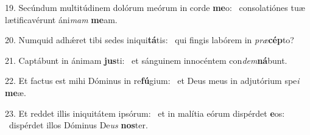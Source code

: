 19. Secúndum multitúdinem dolórum meórum in corde \textbf{me}o: \ast\  consolatiónes tuæ lætificavérunt áni\textit{mam} \textbf{me}am.\

20. Numquid adhǽret tibi sedes iniqui\textbf{tá}tis: \ast\  qui fingis labórem in \textit{præ}\textbf{cép}to?\

21. Captábunt in ánimam \textbf{jus}ti: \ast\  et sánguinem innocéntem con\textit{dem}\textbf{ná}bunt.\

22. Et factus est mihi Dóminus in re\textbf{fú}gium: \ast\  et Deus meus in adjutórium spe\textit{i} \textbf{me}æ.\

23. Et reddet illis iniquitátem ipsórum: \dag\  et in malítia eórum dispérdet \textbf{e}os: \ast\  dispérdet illos Dóminus De\textit{us} \textbf{nos}ter.\

